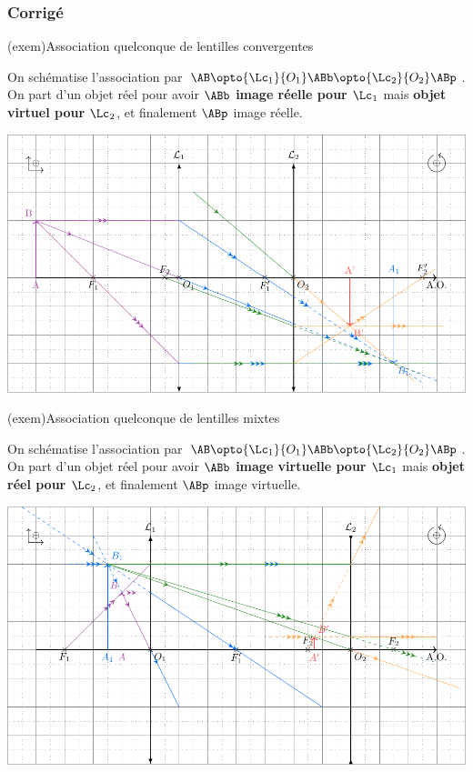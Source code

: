 \documentclass[../../main/main.tex]{subfiles}
\begin{document}
\subsubsection*{Corrigé}
\begin{tcb}[label=exem:asso_lent](exem){Association quelconque de lentilles
			convergentes}

	On schématise l'association par $\AB \opto{\Lc_1}{O_1} \ABb
		\opto{\Lc_2}{O_2} \ABp$. On part d'un objet réel pour avoir $\ABb$
	\textbf{image réelle pour $\Lc_1$} mais \textbf{objet virtuel pour $\Lc_2$},
	et finalement $\ABp$ image réelle.

	\tcblower
	\begin{center}
		\includegraphics[width=.85\linewidth]{asso_lent-a.pdf}
		\label{fig:asso_lent-conv}
	\end{center}
\end{tcb}
\begin{tcb}[label=exem:asso_lent](exem){Association quelconque de lentilles
			mixtes}

	On schématise l'association par $\AB \opto{\Lc_1}{O_1} \ABb
		\opto{\Lc_2}{O_2} \ABp$. On part d'un objet réel pour avoir $\ABb$
	\textbf{image virtuelle pour $\Lc_1$} mais \textbf{objet réel pour $\Lc_2$},
	et finalement $\ABp$ image virtuelle.

	\tcblower
	\begin{center}
		\includegraphics[width=.85\linewidth]{asso_lent-b.pdf}
		\label{fig:asso_lent-mix}
	\end{center}
\end{tcb}
\end{document}
